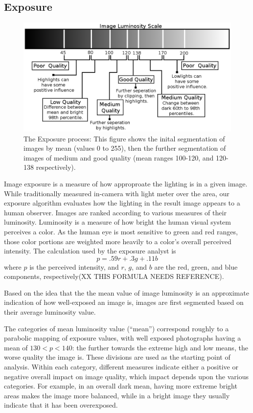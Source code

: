 \documentclass[twocolumn]{article}
\begin{document}
\subsection{Exposure}
\begin{figure}[t]
  \centering
    \includegraphics[scale=0.53,clip]{imageluminosity.eps}
  \caption{The Exposure process: This figure shows the inital segmentation of images by mean (values 0 to 255), then the further segmentation of images of medium and good quality (mean ranges 100-120, and 120-138 respectively).}
\end{figure}
Image exposure is a measure of how approproate the lighting is in a given image.  While traditionally measured in-camera with light meter over the area, our exposure algorithm evaluates how the lighting in the result image appears to a human observer.  Images are ranked according to various measures of their luminosity.  Luminosity is a measure of how bright the human visual system perceives a color. As the human eye is most sensitive to green and red ranges, those color portions are weighted more heavily to a color's overall perceived intensity. The calculation used by the exposure analyst is
\[
p=.59r+.3g+.11b
\]
where \(p\) is the perceived intensity, and \(r\), \(g\), and \(b\) are the red, green, and blue components, respectively(XX THIS FORMULA NEEDS REFERENCE).

Based on the idea that the the mean value of image luminosity is an approximate indication of how well-exposed an image is, images are first segmented based on their average luminosity value.

The categories of mean luminosity value (“mean”) correspond roughly to a parabolic mapping of exposure values, with well exposed photographs having a mean of \(130<p<140\): the further towards the extreme high and low means, the worse quality the image is. These divisions are used as the starting point of analysis. Within each category, different measures indicate either a positive or negative overall impact on image quality, which impact depends upon the various categories. For example, in an overall dark mean, having more extreme bright areas makes the image more balanced, while in a bright image they usually indicate that it has been overexposed.
\end{document}
